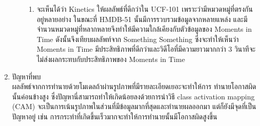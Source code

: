 \begin{enumerate}
\begin{enumerate}
\begin{enumerate}
				\item จะเห็นได้ว่า Kinetics ให้ผลลัพธ์ที่ดีกว่าใน UCF-101 เพราะว่ามีหมวดหมู่ที่ตรงกันอยู่หลายอย่าง ในขณะที่ HMDB-51 นั้นมีการรวบรวมข้อมูลจากหลายแหล่ง 
				และมีจำนวนหมวดหมู่ที่หลากหลายจึงทำให้มีความใกล้เคียงกับตัวข้อมูลของ Moments in Time ดังนั้นจึงเทียบผลลัพท์จาก Something Something 
				ซึ่งจะทำให้เห็นว่า Moments in Time มีประสิทธิภาพที่ดีกว่าและวิดีโอที่มีความยาวมากกว่า 3 วินาทีจะไม่ส่งผลกระทบกับประสิทธิภาพของ Moments in Time
		\end{enumerate}
	\end{enumerate}
	\clearpage
	\item {ปัญหาที่พบ}\\
	ผลลัพธ์จากการทำนายด้วยโมเดลถ้าผ่านรูปภาพที่มีรายละเอียดเยอะจะทำให้การ ทำนายโอกาสผิดนั้นค่อนข้างสูง ซึ่งปัญหานี่สามารถทำให้เกิดน้อยลงด้วยการนำวิธี 
	class activation mapping (CAM) จะเป็นการเน้นรูปภาพในส่วนที่มีข้อมูลมากที่สุดและทำนายผลออกมา แต่ก็ยังมีจุดที่เป็นปัญหาอยู่ เช่น 
	การกระทำที่เกิดขึ้นเร็วมากจะทำให้การทำนายนั้นมีโอกาสผิดสูงขึ้น
\end{enumerate}		